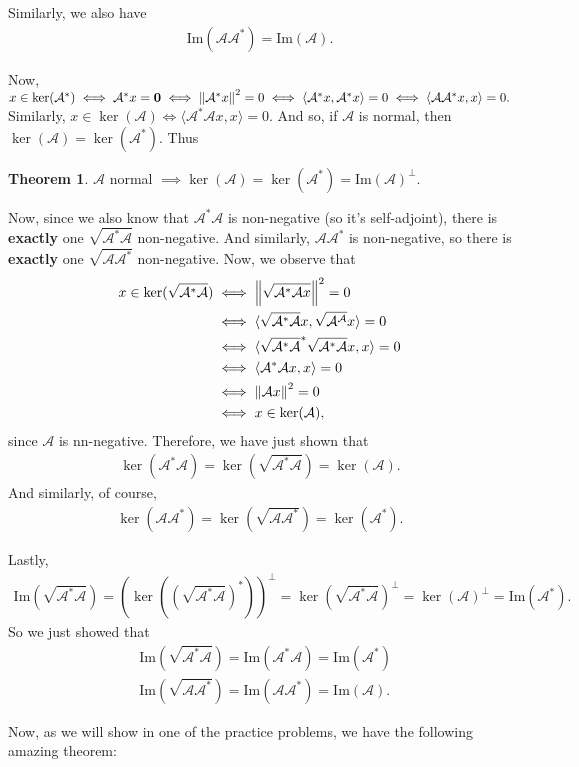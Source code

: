 \documentclass{book}
\theoremstyle{definition}
\newtheorem{thm}{Theorem}[section]
\newcommand{\A}{\mathcal{A}}
\newcommand{\ima}{\text{Im}}
\newcommand{\la}{\langle}
\newcommand{\ra}{\rangle}
\newcommand{\lp}{\left(}
\newcommand{\rp}{\right)}
\begin{document}
Similarly, we also have 
\begin{align*}
\ima(\A\A^*) = \ima(\A).
\end{align*}


Now, $x\in \ker(\A^*) \iff \A^* x = \mathbf{0} \iff \norm{\A^* x}^2 = 0\iff
\la \A^* x, \A^* x \ra = 0\iff \la \A\A^* x, x \ra = 0.$
Similarly, $x\in \ker(\A) \iff \la \A^*\A x,x \ra = 0$. And so, if $\A$ is normal, then $\ker(\A) = \ker(\A^*)$. Thus
\begin{thm}
	$\A$ normal $\implies \ker(\A) = \ker(\A^*) = \ima(\A)^\perp$.
\end{thm}


Now, since we also know that $\A^*\A$ is non-negative (so it's self-adjoint), there is \textbf{exactly} one $\sqrt{\A^*\A}$ non-negative. And similarly, $\A\A^*$ is non-negative, so there is \textbf{exactly} one $\sqrt{\A\A^*}$ non-negative. Now, we observe that
\begin{align*}
x \in \ker(\sqrt{\A^*\A}) &\iff \norm{\sqrt{\A^*\A x}}^2 = 0\\
&\iff \la \sqrt{\A^*\A} x , \sqrt{\A^\A} x \ra = 0\\
&\iff \la \sqrt{\A^*\A}^* \sqrt{\A^*\A}  x,x  \ra = 0\\
&\iff \la \A^*\A x,x \ra = 0\\
&\iff \norm{\A x}^2 = 0 \\
&\iff x\in \ker(\A),
\end{align*}
since $\A$ is nn-negative. Therefore, we have just shown that
\begin{align*}
\ker(\A^*\A) =\ker(\sqrt{\A^*\A}) = \ker(\A).
\end{align*}
And similarly, of course,
\begin{align*}
\ker(\A\A^*) = \ker(\sqrt{\A\A^*}) = \ker(\A^*).
\end{align*}

Lastly, 
\begin{align*}
\ima(\sqrt{\A^*\A}) = \lp \ker({(\sqrt{\A^*\A})}^*) \rp^\perp = \ker(\sqrt{\A^*\A})^\perp = \ker(\A)^\perp = \ima(\A^*).
\end{align*}
So we just showed that
\begin{align*}
& \ima(\sqrt{\A^*\A}) = \ima(\A^*\A) = \ima(\A^*)\\
& \ima(\sqrt{\A\A^*}) = \ima(\A\A^*) = \ima(\A).
\end{align*}


Now, as we will show in one of the practice problems, we have the following amazing theorem:
\end{document}

